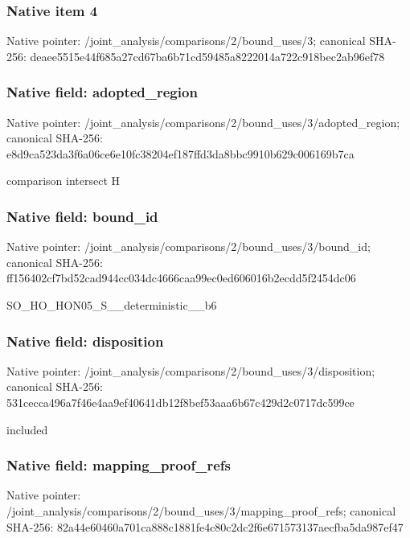 \documentclass[10pt,a4paper]{article}
\begin{document}
\subsubsection{Native item 4}
Native pointer: /joint\_\allowbreak{}analysis/comparisons/2/bound\_\allowbreak{}uses/3; canonical SHA-256: deaee5515e44f685a27cd67ba6b71cd59485a8222014a722c918bec2ab96ef78

\subsubsection{Native field: adopted\_\allowbreak{}region}
Native pointer: /joint\_\allowbreak{}analysis/comparisons/2/bound\_\allowbreak{}uses/3/adopted\_\allowbreak{}region; canonical SHA-256: e8d9ca523da3f6a06ce6e10fc38204ef187ffd3da8bbc9910b629c006169b7ca

\begingroup\raggedright\sloppy comparison intersect H\par\endgroup

\subsubsection{Native field: bound\_\allowbreak{}id}
Native pointer: /joint\_\allowbreak{}analysis/comparisons/2/bound\_\allowbreak{}uses/3/bound\_\allowbreak{}id; canonical SHA-256: ff156402cf7bd52cad944cc034dc4666caa99ec0ed606016b2ecdd5f2454dc06

\begingroup\raggedright\sloppy SO\_\allowbreak{}HO\_\allowbreak{}HON05\_\allowbreak{}S\_\allowbreak{}\_\allowbreak{}deterministic\_\allowbreak{}\_\allowbreak{}b6\par\endgroup

\subsubsection{Native field: disposition}
Native pointer: /joint\_\allowbreak{}analysis/comparisons/2/bound\_\allowbreak{}uses/3/disposition; canonical SHA-256: 531cecca496a7f46e4aa9ef40641db12f8bef53aaa6b67c429d2c0717dc599ce

\begingroup\raggedright\sloppy included\par\endgroup

\subsubsection{Native field: mapping\_\allowbreak{}proof\_\allowbreak{}refs}
Native pointer: /joint\_\allowbreak{}analysis/comparisons/2/bound\_\allowbreak{}uses/3/mapping\_\allowbreak{}proof\_\allowbreak{}refs; canonical SHA-256: 82a44e60460a701ca888c1881fe4c80c2dc2f6e671573137aecfba5da987ef47
\end{document}
